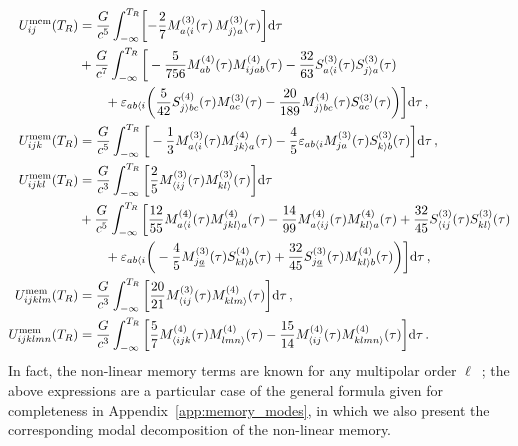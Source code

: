 \documentclass[prd,preprint,superscriptaddress,tightenlines,nofootinbib,
  eqsecnum,showpacs]{revtex4}
\newcommand{\ud}{\mathrm{d}}
\begin{document}
\begin{subequations}
\begin{align}
U_{ij}^{\text{mem}}(T_R) &= \frac{G}{c^5}\int_{-\infty}^{T_R}
\biggl[-\frac{2}{7}M^{(3)}_{a\langle i}(\tau)\,M^{(3)}_{j\rangle
    a}(\tau) \biggr]\ud \tau\nonumber \\ &+ \frac{G}{c^7}
\int_{-\infty }^{T_R} \bigg[- \frac{5}{756} M_{ab}^{(4)} (\tau)
  M_{ijab}^{(4)}(\tau)-\frac{32}{63} S_{a \langle i}^{(3)} (\tau) S_{j
    \rangle a}^{(3)} (\tau) \nonumber \\ &\qquad + \varepsilon_{ab
    \langle i} \bigg( \frac{5}{42} S_{j \rangle bc}^{(4)} (\tau)
  M_{ac}^{(3)} (\tau) - \frac{20}{189} M_{j \rangle bc}^{(4)} (\tau)
  S_{ac}^{(3)} (\tau) \bigg) \bigg] \ud \tau \,,\\
U_{ijk}^\text{mem}(T_R) &= {G\over c^5} \int_{-\infty}^{T_R}
\bigg[-{1\over3}M^{(3)}_{a\langle i} (\tau)M^{(4)}_{jk\rangle a}
(\tau)-{4\over5}\varepsilon_{ab\langle i} M^{(3)}_{ja} (\tau)S^{(3)}_{k\rangle
b} (\tau)\bigg]\ud \tau \,,\\ 
U_{ijkl}^\text{mem}(T_R) &= \frac{G}{c^3}\int_{-\infty}^{T_R}
\bigg[{2\over5} M^{(3)}_{\langle ij}(\tau)M^{(3)}_{kl\rangle
  }(\tau)\bigg]\ud\tau \nonumber \\ &+ \frac{G}{c^5}
  \int_{-\infty}^{T_R} \bigg[ \frac{12}{55} M_{a \langle i}^{(4)}
    (\tau) M_{jkl \rangle a}^{(4)}(\tau) - \frac{14}{99} M_{a \langle
      ij}^{(4)}(\tau) M_{kl \rangle a}^{(4)} (\tau) + \frac{32}{45}
    S_{\langle ij}^{(3)}(\tau) S_{kl \rangle}^{(3)} (\tau) \nonumber
    \\ &\qquad + \varepsilon_{ab \langle i} \bigg(- \frac{4}{5} M_{j
      \underline{a}}^{(3)}(\tau) S_{kl \rangle b}^{(4)} (\tau) +
    \frac{32}{45} S_{j \underline{a}}^{(3)}(\tau) M_{kl \rangle
      b}^{(4)}(\tau) \bigg) \bigg] \ud \tau \,,\\ 
U_{ijklm}^\text{mem}(T_R) &= \frac{G}{c^3}\int_{-\infty}^{T_R}
\bigg[{20\over21} M^{(3)}_{\langle
    ij}(\tau)M^{(4)}_{klm\rangle}(\tau)\bigg]\ud\tau \,,\\
U_{ijklmn}^\text{mem}(T_R) &= \frac{G}{c^3} \int_{-\infty}^{T_R}\bigg[
  \frac{5}{7} M_{\langle ijk}^{(4)} (\tau) M_{lmn \rangle}^{(4)}
  (\tau) - \frac{15}{14} M_{\langle ij}^{(4)} (\tau) M_{klmn
    \rangle}^{(4)} (\tau) \bigg] \ud \tau \,.
\end{align}
\end{subequations}
%
In fact, the non-linear memory terms are known for any multipolar
order $\ell$~\cite{F09}; the above expressions are a particular case
of the general formula given for completeness in
Appendix~\ref{app:memory_modes}, in which we also present the
corresponding modal decomposition of the non-linear memory.
\end{document}
